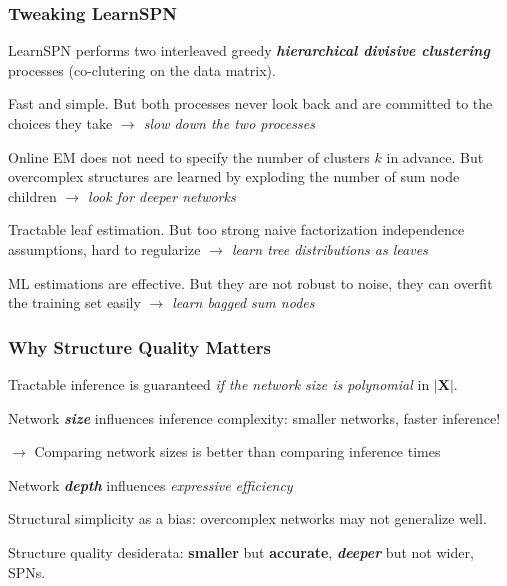 \documentclass[10pt, t, xcolor={usenames,dvipsnames,svgnames}, compress]{beamer}
\begin{document}
\begin{frame}
  \frametitle{Tweaking LearnSPN}
  
  \textsf{LearnSPN} performs two interleaved greedy
  \textbf{\emph{hierarchical divisive clustering}}
  processes (co-clutering on the data matrix).\par\bigskip

  Fast and simple. But both processes never look back and are
  committed to the choices they take \emph{$\rightarrow$ slow down the two
  processes}\par\bigskip

  Online EM does not need to specify the number of clusters $k$ in
  advance. But overcomplex structures are learned by exploding the number of sum
  node children \emph{$\rightarrow$ look for deeper networks}\par\bigskip

  Tractable leaf estimation. But too strong naive factorization independence
  assumptions, hard to regularize \emph{$\rightarrow$ learn tree
    distributions as leaves}\par\bigskip

  ML estimations are effective. But they are not robust to noise, they
  can overfit the training set easily
  \emph{$\rightarrow$ learn bagged sum nodes}
\end{frame}

\begin{frame}
  \frametitle{Why Structure Quality Matters}

  Tractable inference is guaranteed \emph{if the network size is polynomial} in $|\mathbf{X}|$.\par\bigskip

  Network \emph{\textbf{size}} influences inference complexity: smaller networks,
  faster inference!\par
  $\rightarrow$ Comparing network sizes is better than comparing inference times\par\bigskip

  Network \emph{\textbf{depth}} influences \emph{expressive efficiency}~\parencite{Martens2014}~\parencite{Zhao2015}\par\bigskip

  Structural simplicity as a bias: overcomplex networks may not generalize well.\par\bigskip
  
  Structure quality desiderata: \textbf{\textbf{smaller}} but \textbf{\textbf{accurate}}, \textbf{\emph{deeper}} but not
  wider, SPNs.
\end{frame}
\end{document}
